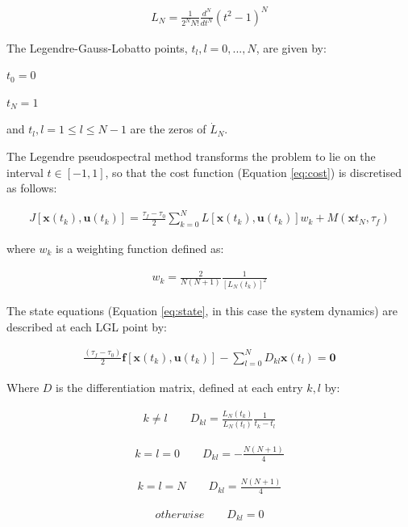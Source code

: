\begin{eqnarray}
L_N = \frac{1}{2^N N!} \frac{d^N}{dt^N}(t^2-1)^N
\end{eqnarray}

The Legendre-Gauss-Lobatto points, $t_l, l=0,...,N$, are given by:

$t_0 = 0$

$t_N = 1$

and $t_l, l=1\leq l \leq N-1$ are the zeros of $\dot{L}_N$.

The Legendre pseudospectral method transforms the problem to lie on the interval $t \in [-1,1]$, so that the cost function  (Equation \ref{eq:cost}) is discretised as follows:

\begin{eqnarray}
J[\textbf{x}(t_k),\textbf{u}(t_k)] = \frac{\tau_f - \tau_0}{2} \sum_{k=0}^{N}L[\textbf{x}(t_k),\textbf{u}(t_k)]w_k + M(\textbf{x}t_N,\tau_f)
\end{eqnarray}

where $ w_k $ is a weighting function defined as:

\begin{eqnarray}
w_k = \frac{2}{N(N+1)} \frac{1}{[L_N(t_k)]^2}
\end{eqnarray}

The state equations (Equation \ref{eq:state}, in this case the system dynamics) are described at each LGL point by:

\begin{eqnarray}
\frac{(\tau_f - \tau_0)}{2}\textbf{f}[\textbf{x}(t_k),\textbf{u}(t_k)] - \sum_{l=0}^{N} D_{kl} \textbf{x}(t_l) = \textbf{0}
\end{eqnarray}

Where $D$ is the differentiation matrix, defined at each entry $k,l$ by:

\begin{eqnarray}
k \neq l\qquad
D_{kl} = \frac{L_N(t_k)}{L_N(t_l)} \frac{1}{t_k - t_l}
\end{eqnarray}

\begin{eqnarray}
k = l = 0\qquad
D_{kl} = - \frac{N(N+1)}{4} 
\end{eqnarray}

\begin{eqnarray}
k = l = N\qquad
D_{kl} = \frac{N(N+1)}{4} 
\end{eqnarray}

\begin{eqnarray}
otherwise \qquad
D_{kl} = 0
\end{eqnarray}

